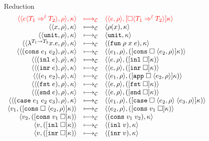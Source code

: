 \documentclass[acmsmall,review,anonymous]{acmart}\settopmatter{printfolios=true,printccs=false,printacmref=false}
\newcommand{\sOOinspect}[3]{\langle\langle#1,#2\rangle,#3\rangle}
\newcommand{\sOOreturn}[2]{\langle#1,#2\rangle}
\newcommand{\eOOvar}[1]{#1}
\newcommand{\eOOsole}[0]{\mathtt{unit}}
\newcommand{\eOOlam}[4]{\lambda^{#1\rightarrow{}#2}#3.#4}
\newcommand{\eOOapp}[2]{#1 \; #2}
\newcommand{\eOOcons}[2]{\mathtt{cons} \; #1 \; #2}
\newcommand{\eOOcar}[1]{\mathtt{fst} \; #1}
\newcommand{\eOOcdr}[1]{\mathtt{snd} \; #1}
\newcommand{\eOOinl}[1]{\mathtt{inl} \; #1}
\newcommand{\eOOinr}[1]{\mathtt{inr} \; #1}
\newcommand{\eOOcase}[3]{\mathtt{case} \; #1 \; #2 \; #3}
\newcommand{\eOOcast}[4]{#1 \langle \cOOcast{#2}{#3}{#4} \rangle}
\newcommand{\cOOcast}[3]{#1 \Rightarrow^{#2} #3}
\newcommand{\vOOfun}[3]{\mathtt{fun} \; #1 \; #2 \; #3}
\newcommand{\vOOtt}[0]{\mathtt{unit}}
\newcommand{\vOOcons}[2]{\mathtt{cons}\;#1\;#2}
\newcommand{\vOOinl}[1]{\mathtt{inl}\;#1}
\newcommand{\vOOinr}[1]{\mathtt{inr}\;#1}
\newcommand{\kOOconsI}[3]{[\mathtt{cons} \; \square \; \langle#1,#2\rangle ]#3}
\newcommand{\kOOconsII}[2]{[\mathtt{cons} \; #1 \; \square]#2}
\newcommand{\kOOinl}[1]{[\mathtt{inl} \; \square]#1}
\newcommand{\kOOinr}[1]{[\mathtt{inr} \; \square]#1}
\newcommand{\kOOappI}[3]{
	[\mathtt{app} \; \square \; \langle#1,#2\rangle ]#3
}
\newcommand{\kOOcar}[1]{[\mathtt{fst} \; \square]#1}
\newcommand{\kOOcdr}[1]{[\mathtt{snd} \; \square]#1}
\newcommand{\kOOcaseI}[4]{
	[\mathtt{case} \; \square \; \langle#1,#3\rangle \; \langle#2,#3\rangle ]#4}
\newcommand{\kOOcast}[2]{
	[\square \langle #1 \rangle]#2}
\newcommand{\judgeCreduce}[2]{#1 \longmapsto_{\mathcal{C}} #2}
\newcommand{\redrule}[3]{#1 & \longmapsto_\mathcal{C} & #2 & #3\\}
\newcommand{\hiredrule}[3]{\highlight{#1} & \highlight{\longmapsto_\mathcal{C}} & \highlight{#2} & \highlight{#3} \\}
\newcommand{\highlight}[1]{{\color{red} #1}}
\begin{document}
\begin{figure}
	
	\[
	\begin{array}{rclr}
	\end{array}
	\]
	
	Reduction \fbox{$\judgeCreduce{s}{s}$}
	\[
	\begin{array}{rclr}
		\hiredrule{
		\sOOinspect{\eOOcast{e}{T_1}{l}{T_2}}{\rho}{\kappa}
	}{
		\sOOinspect{e}{\rho}{
			\kOOcast{\cOOcast{T_1}{l}{T_2}}{\kappa}
		}
	}{}
	\redrule{
		\sOOinspect{\eOOvar{x}}{\rho}{\kappa}
	}{	
		\sOOreturn{\rho(x)}{\kappa}
	}{}
	\redrule{
		\sOOinspect{\eOOsole}{\rho}{\kappa}
	}{
		\sOOreturn{\vOOtt}{\kappa}
	}{}
	\redrule{
		\sOOinspect{\eOOlam{T_1}{T_2}{x}{e}}{\rho}{\kappa}
	}{
		\sOOreturn{(\vOOfun{\rho}{x}{e})}{\kappa}
	}{}
	\redrule{
		\sOOinspect{(\eOOcons{e_1}{e_2})}{\rho}{\kappa}
	}{
		\sOOinspect{e_1}{\rho}{(\kOOconsI{e_2}{\rho}{\kappa})}
	}{}
	\redrule{
		\sOOinspect{(\eOOinl{e})}{\rho}{\kappa}
	}{
		\sOOinspect{e}{\rho}{(\kOOinl{\kappa})}
	}{}
	\redrule{
	\sOOinspect{(\eOOinr{e})}{\rho}{\kappa}
	}{
	\sOOinspect{e}{\rho}{(\kOOinr{\kappa})}
	}{}
	\redrule{
		\sOOinspect{(\eOOapp{e_1}{e_2})}{\rho}{\kappa}
	}{
\sOOinspect{e_1}{\rho}{(\kOOappI{e_2}{\rho}{\kappa})}}{}

\redrule{
\sOOinspect{(\eOOcar{e})}{\rho}{\kappa}}{
\sOOinspect{e}{\rho}{(\kOOcar{\kappa})}}{}

\redrule{
	\sOOinspect{(\eOOcdr{e})}{\rho}{\kappa}}{
	\sOOinspect{e}{\rho}{(\kOOcdr{\kappa})}}{}

\redrule{
\sOOinspect{(\eOOcase{e_1}{e_2}{e_3})}{\rho}{\kappa}}{
\sOOinspect{e_1}{\rho}{(\kOOcaseI{e_2}{e_3}{\rho}{\kappa})}}{}

\redrule{
\sOOreturn{v_1}{(\kOOconsI{e_2}{\rho}{\kappa})}}{
\sOOinspect{e_2}{\rho}{(\kOOconsII{v_1}{\kappa})}}{}

\redrule{
\sOOreturn{v_2}{(\kOOconsII{v_1}{\kappa})}}{
\sOOreturn{(\vOOcons{v_1}{v_2})}{\kappa}}{}

\redrule{
\sOOreturn{v}{(\kOOinl{\kappa})}}{
\sOOreturn{(\vOOinl{v})}{\kappa}}{}

\redrule{
\sOOreturn{v}{(\kOOinr{\kappa})}}{
\sOOreturn{(\vOOinr{v})}{\kappa}}{}


\end{array}\]
\end{figure}
\end{document}
